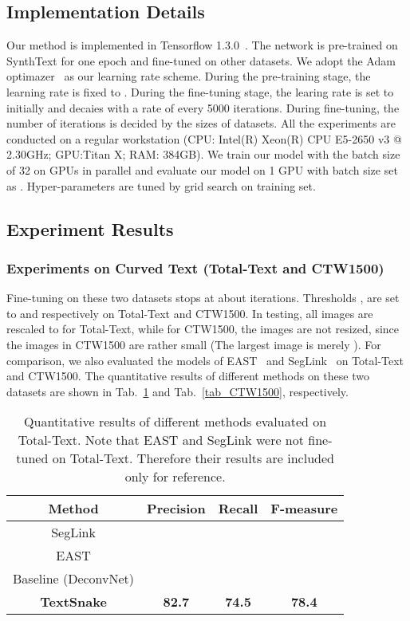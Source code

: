 \documentclass[runningheads]{llncs}
\begin{document}
\subsection{Implementation Details}

Our method is implemented in Tensorflow 1.3.0~\cite{abadi2016tensorflow}.
The network is pre-trained on SynthText for one epoch and fine-tuned on other datasets. We adopt the Adam optimazer~\cite{kingma2014adam} as our learning rate scheme. During the pre-training stage, the learning rate is fixed to . During the fine-tuning stage, the learing rate is set to  initially and decaies with a rate of  every 5000 iterations. During fine-tuning, the number of iterations is decided by the sizes of datasets. All the experiments are conducted on a regular workstation (CPU: Intel(R) Xeon(R) CPU E5-2650 v3 @ 2.30GHz; GPU:Titan X; RAM: 384GB). We train our model with the batch size of 32 on  GPUs in parallel and evaluate our model on 1 GPU with batch size set as . Hyper-parameters are tuned by grid search on training set.

\subsection{Experiment Results}

\subsubsection*{Experiments on Curved Text (Total-Text and CTW1500)}

Fine-tuning on these two datasets stops at about  iterations. Thresholds ,  are set to  and  respectively on Total-Text and CTW1500. In testing, all images are rescaled to  for Total-Text, while for CTW1500, the images are not resized, since the images in CTW1500 are rather small (The largest image is merely ). For comparison, we also evaluated the models of EAST~\cite{Zhou_2017_CVPR} and SegLink~\cite{Shi_2017_CVPR} on Total-Text and CTW1500. The quantitative results of different methods on these two datasets are shown in Tab.~\ref{tab_total} and Tab.~\ref{tab_CTW1500}, respectively. 
\begin{table}
\small
\begin{centering}
\vspace{-2mm}
\caption{Quantitative results of different methods evaluated on Total-Text. Note that EAST and SegLink were not fine-tuned on Total-Text. Therefore their results are included only for reference.}
\label{tab_total}
\begin{tabular}{|c|c|c|c|}
\hline 
\textbf{Method} & \textbf{Precision} & \textbf{Recall} & \textbf{F-measure} \tabularnewline
\hline 
\hline 
SegLink \cite{Shi_2017_CVPR} &   &  & \tabularnewline
\hline 
EAST \cite{Zhou_2017_CVPR} &   &  &  \tabularnewline
\hline 
Baseline (DeconvNet\cite{Noh2015Learning}) &  &  &  \tabularnewline
\hline
\textbf{TextSnake} & \textbf{82.7} & \textbf{74.5} & \textbf{78.4} \tabularnewline
\hline
\end{tabular}
\par\end{centering}
\end{table}
\end{document}
